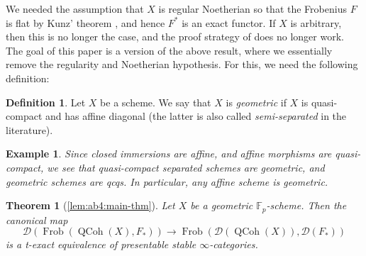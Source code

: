 \documentclass{article}
\theoremstyle{definition}
\theoremstyle{definition}
\newtheorem*{defn*}{Definition}
\theoremstyle{definition}
\theoremstyle{plain}
\theoremstyle{plain}
\theoremstyle{plain}
\theoremstyle{plain}
\theoremstyle{plain}
\theoremstyle{plain}
\theoremstyle{plain}
\theoremstyle{plain}
\newtheorem*{exmpl*}{Example}
\theoremstyle{remark}
\theoremstyle{remark}
\theoremstyle{plain}
\newtheorem{introthm}{Theorem}
\theoremstyle{plain}
\theoremstyle{plain}
\theoremstyle{plain}
\theoremstyle{plain}
\newcommand{\Fp}{\mathbb{F}_p}
\newcommand{\QCoh}[1]{\operatorname{QCoh}(#1)}
\newcommand{\Frob}[2]{\operatorname{Frob}(#1, #2)}
\newcommand{\Cat}[1]{\mathcal{#1}}
\begin{document}
We needed the assumption that $X$ is regular Noetherian so that 
the Frobenius $F$ is flat by Kunz' theorem \cite[Theorem 2.1]{kunz1969characterizations},
and hence $F^*$ is an exact functor. If $X$ is arbitrary,
then this is no longer the case, and the proof strategy of \cite{cartmod}
does no longer work.
The goal of this paper is a version of the above result,
where we essentially remove the regularity and Noetherian hypothesis.
For this, we need the following definition:
\begin{defn*}
    Let $X$ be a scheme. We say that $X$ is \emph{geometric} 
    if $X$ is quasi-compact and has affine diagonal (the latter is also called 
    \emph{semi-separated} in the literature).
\end{defn*}
\begin{exmpl*}
    Since closed immersions are affine, and affine morphisms are quasi-compact,
    we see that quasi-compact separated schemes are geometric,
    and geometric schemes are qcqs.
    In particular, any affine scheme is geometric.
\end{exmpl*}

\begin{introthm}[{\cref{lem:ab4:main-thm}}] \label{lem:intro:main-thm}
    Let $X$ be a geometric $\Fp$-scheme.
    Then the canonical map 
    \begin{equation*}
        \Cat D(\Frob{\QCoh{X}}{F_*}) \to \Frob{\Cat D(\QCoh{X})}{\Cat D(F_*)}
    \end{equation*}
    is a t-exact equivalence of presentable stable $\infty$-categories.
\end{introthm}
\end{document}
